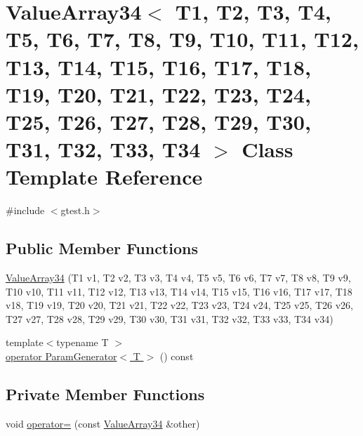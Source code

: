 \hypertarget{classtesting_1_1internal_1_1ValueArray34}{\section{\-Value\-Array34$<$ \-T1, \-T2, \-T3, \-T4, \-T5, \-T6, \-T7, \-T8, \-T9, \-T10, \-T11, \-T12, \-T13, \-T14, \-T15, \-T16, \-T17, \-T18, \-T19, \-T20, \-T21, \-T22, \-T23, \-T24, \-T25, \-T26, \-T27, \-T28, \-T29, \-T30, \-T31, \-T32, \-T33, \-T34 $>$ \-Class \-Template \-Reference}
\label{dc/de9/classtesting_1_1internal_1_1ValueArray34}
}


{\ttfamily \#include $<$gtest.\-h$>$}

\subsection*{\-Public \-Member \-Functions}
\begin{DoxyCompactItemize}
\item 
\hyperlink{classtesting_1_1internal_1_1ValueArray34_a5fb972e0ce2643eabcc329b332199f15}{\-Value\-Array34} (\-T1 v1, \-T2 v2, \-T3 v3, \-T4 v4, \-T5 v5, \-T6 v6, \-T7 v7, \-T8 v8, \-T9 v9, \-T10 v10, \-T11 v11, \-T12 v12, \-T13 v13, \-T14 v14, \-T15 v15, \-T16 v16, \-T17 v17, \-T18 v18, \-T19 v19, \-T20 v20, \-T21 v21, \-T22 v22, \-T23 v23, \-T24 v24, \-T25 v25, \-T26 v26, \-T27 v27, \-T28 v28, \-T29 v29, \-T30 v30, \-T31 v31, \-T32 v32, \-T33 v33, \-T34 v34)
\item 
{\footnotesize template$<$typename T $>$ }\\\hyperlink{classtesting_1_1internal_1_1ValueArray34_a08ef46fa12c9dd8ef6fc630baeea89b7}{operator Param\-Generator$<$ T $>$} () const 
\end{DoxyCompactItemize}
\subsection*{\-Private \-Member \-Functions}
\begin{DoxyCompactItemize}
\item 
void \hyperlink{classtesting_1_1internal_1_1ValueArray34_a750ec834e95aad1e0fcbd6981b4b9d0c}{operator=} (const \hyperlink{classtesting_1_1internal_1_1ValueArray34}{\-Value\-Array34} \&other)
\end{DoxyCompactItemize}
